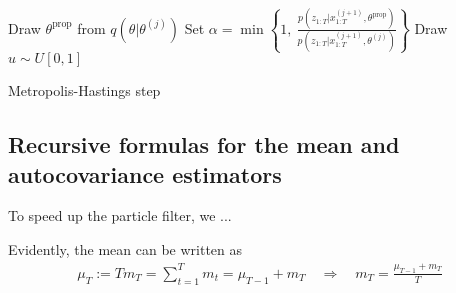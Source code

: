 \documentclass[11pt, letterpaper, notitlepage]{article}
\begin{document}
\begin{algorithm}[H]


 \SetStartEndCondition{ }{}{}%
 \SetInd{.5em}{2em} 
   
 \BlankLine
 Draw $\theta^{\text{prop}}$ from $q\left(\theta | \theta^{(j)}\right)$
 \BlankLine
 Set $\alpha = \min\left\{1, \ \frac{p\left(z_{1:T}| x^{(j+1)}_{1:T}, \theta^{\text{prop}}\right)}{p\left(z_{1:T} | x^{(j+1)}_{1:T}, \theta^{(j)}\right)} \right\}$ 
 \BlankLine
 Draw $u\sim U[0,1]$\\
 \BlankLine
 

 \BlankLine  

 \caption{Metropolis-Hastings step}
\end{algorithm}

\subsection*{Recursive formulas for the mean and autocovariance estimators}

To speed up the particle filter, we ...

Evidently, the mean can be written as
\begin{align*}
\mu_{T} := T m_T = \sum_{t=1}^{T} m_t = \mu_{T-1} + m_T \quad \Rightarrow \quad m_T = \frac{\mu_{T-1} + m_T}{T}
\end{align*}
\end{document}
